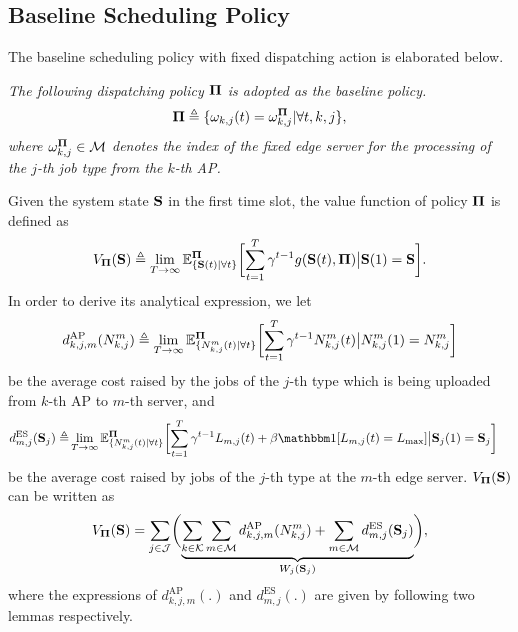 \subsection{Baseline Scheduling Policy}
The baseline scheduling policy with fixed dispatching action is elaborated below.
\begin{policy}
    \label{Pol:baseline} \em
    The following dispatching policy $\mathbf{\Pi}$ is adopted as the baseline policy.
    \begin{align}
    \mathbf{\Pi} \triangleq \{\omega_{k,j}(t)=\omega_{k,j}^{\mathbf{\Pi}}|\forall t,k,j\},
    \end{align}
    where $\omega_{k,j}^{\mathbf{\Pi}}\in\mathcal{M}$ denotes the index of the fixed edge server for the processing of the $j$-th job type from the $k$-th AP.
\end{policy}

Given the system state $\mathbf{S}$ in the first time slot, the value function of policy $\mathbf{\Pi}$ is defined as
\begin{align}
    V_{\Baseline}(\Stat)\define \lim\limits_{T\to\infty} \mathbb{E}_{\{\Stat(t)|\forall t\}}^{\Baseline} \Bracket{
        \sum_{t=1}^{T} \gamma^{t-1}g(\Stat(t),\Baseline)\big|\Stat(1)=\Stat
    }.
\end{align}
In order to derive its analytical expression, we let 
\begin{align}
    {d}_{k,j,m}^{\text{AP}}(N_{k,j}^m) \define \lim\limits_{T\to\infty} \mathbb{E}^{\Baseline}_{\{N_{k,j}^{m}(t)|\forall t\}} \Bracket{
        \sum_{t=1}^{T}\gamma^{t-1}N_{k,j}^{m}(t)\big|N_{k,j}^{m}(1)=N_{k,j}^{m}
    }
\end{align}
be the average cost raised by the jobs of the $j$-th type which is being uploaded from $k$-th AP to $m$-th server, and 
\begin{align}
    {d}_{m,j}^{\text{ES}}(\Stat_j)\define &\lim\limits_{T\to\infty} \mathbb{E}^{\Baseline}_{\{N_{k,j}^{m}(t)|\forall t\}}\Bracket{
        \sum_{t=1}^{T} \gamma^{t-1}L_{m,j}(t)
        + \beta \indicator[L_{m,j}(t)=L_{\max}]\big|\Stat_j(1)=\Stat_j
    }
\end{align}
be the average cost raised by jobs of the $j$-th type at the $m$-th edge server. $V_{\mathbf{\Pi}}(\mathbf{S})$ can be written as 
\begin{align}\label{eqn:V_baseline}
    V_{\Baseline}(\Stat) = \sum_{j\in\jSpace}\Paren{
        \underbrace{\sum_{k\in\apSet}\sum_{m\in\esSet}{d}_{k,j,m}^{\text{AP}}(N_{k,j}^{m})
        +\sum_{m\in\esSet}{d}_{m,j}^{\text{ES}}(\Stat_j)}_{W_{j}(\Stat_j)}
    },
\end{align}
where the expressions of ${d}_{k,j,m}^{\text{AP}}(.)$ and ${d}_{m,j}^{\text{ES}}(.)$ are given by following two lemmas respectively.

